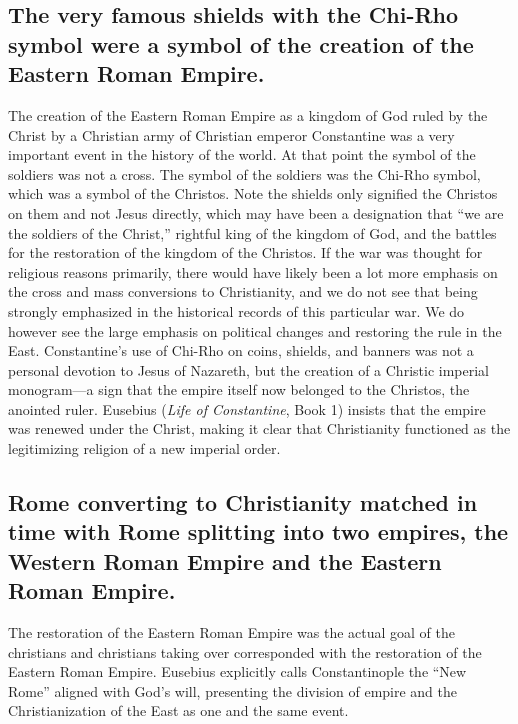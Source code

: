 \subsection{The very famous shields with the Chi-Rho symbol were a symbol of the creation of the Eastern Roman Empire.}\label{par:the-very-famous-shields-of-with-the-chi-rho-symbol-were-a-symbol-of-the-creation-of-the-eastern-roman-empire.}

The creation of the Eastern Roman Empire as a kingdom of God ruled by the Christ by a Christian army of Christian emperor Constantine was a very important event in the history of the world.
At that point the symbol of the soldiers was not a cross.
The symbol of the soldiers was the Chi-Rho symbol, which was a symbol of the Christos.
Note the shields only signified the Christos on them and not Jesus directly, which may have been a designation that ``we are the soldiers of the Christ,'' rightful king of the kingdom of God, and the battles for the restoration of the kingdom of the Christos.
If the war was thought for religious reasons primarily, there would have likely been a lot more emphasis on the cross and mass conversions to Christianity, and we do not see that being strongly emphasized in the historical records of this particular war.
We do however see the large emphasis on political changes and restoring the rule in the East.
Constantine’s use of Chi-Rho on coins, shields, and banners was not a personal devotion to Jesus of Nazareth, but the creation of a Christic imperial monogram---a sign that the empire itself now belonged to the Christos, the anointed ruler.
Eusebius (\emph{Life of Constantine}, Book 1) insists that the empire was renewed under the Christ, making it clear that Christianity functioned as the legitimizing religion of a new imperial order.

\subsection{Rome converting to Christianity matched in time with Rome splitting into two empires, the Western Roman Empire and the Eastern Roman Empire.}\label{par:rome-converting-to-christianity-matched-in-time-with-rome-splitting-into-two-empires-the-western-roman-empire-and-the-eastern-roman-empire.}

The restoration of the Eastern Roman Empire was the actual goal of the christians and christians taking over corresponded with the restoration of the Eastern Roman Empire.
Eusebius explicitly calls Constantinople the ``New Rome'' aligned with God’s will, presenting the division of empire and the Christianization of the East as one and the same event.

